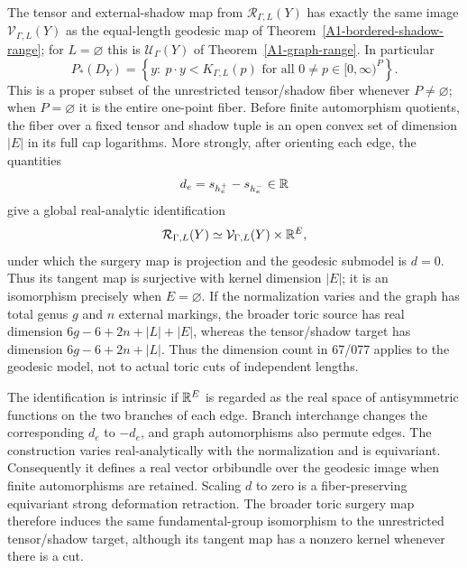 \begin{theorem}
\label{A1-toric-domain}
The tensor and external-shadow map from $\mathcal R_{\Gamma,L}(Y)$
has exactly the same image $\mathcal V_{\Gamma,L}(Y)$ as the
equal-length geodesic map of
Theorem~\ref{A1-bordered-shadow-range}; for $L=\varnothing$ this is
$\mathcal U_\Gamma(Y)$ of Theorem~\ref{A1-graph-range}. In particular
\[
 P_*(D_Y)=\left\{y:\ p\cdot y<K_{\Gamma,L}(p)
                   \text{ for all }0\ne p\in[0,\infty)^P\right\}.
\]
This is a proper subset of the unrestricted tensor/shadow fiber
whenever $P\ne\varnothing$; when $P=\varnothing$ it is the
entire one-point fiber.
Before finite automorphism quotients, the fiber over a fixed tensor
and shadow tuple is an open convex set of dimension $|E|$ in its
full cap logarithms. More strongly, after orienting each edge, the
quantities
\[
 d_e=s_{h_e^+}-s_{h_e^-}\in{\ensuremath{\mathbb{R}}}
\]
give a global real-analytic identification
\[
 \mathcal R_{\Gamma,L}(Y)
       \simeq\mathcal V_{\Gamma,L}(Y)\times{\ensuremath{\mathbb{R}}}^E,
\]
under which the surgery map is projection and the geodesic submodel
is $d=0$. Thus its tangent map is surjective with kernel dimension
$|E|$; it is an isomorphism precisely when $E=\varnothing$.
If the normalization varies and the graph has total genus $g$ and
$n$ external markings, the broader toric source has real dimension
$6g-6+2n+|L|+|E|$, whereas the tensor/shadow target has dimension
$6g-6+2n+|L|$. Thus the dimension count in 67/077 applies to the
geodesic model, not to actual toric cuts of independent lengths.

The identification is intrinsic if ${\mathbb{R}}^E$ is regarded as the real
space of antisymmetric functions on the two branches of each edge.
Branch interchange changes the corresponding $d_e$ to $-d_e$,
and graph automorphisms also permute edges. The construction varies
real-analytically with the normalization and is equivariant.
Consequently it defines a real vector orbibundle over the geodesic
image when finite automorphisms are retained. Scaling $d$ to zero
is a fiber-preserving equivariant strong deformation retraction.
The broader toric surgery map therefore induces the same
fundamental-group isomorphism to the unrestricted tensor/shadow
target, although its tangent map has a nonzero kernel whenever
there is a cut.
\end{theorem}
